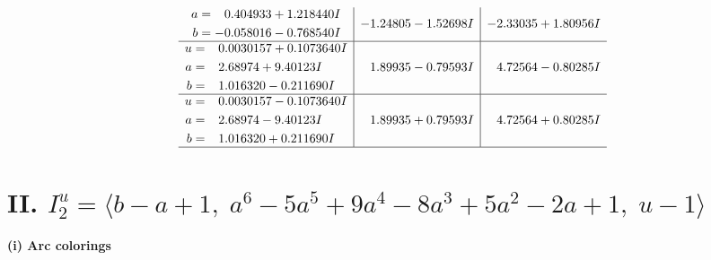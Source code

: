 \documentclass[1p]{elsarticle_modified}
\theoremstyle{definition}
\begin{document}
$$\begin{array}{c|c|c}
\begin{aligned}
a &= \phantom{-}0.404933 + 1.218440 I \\
b &= -0.058016 - 0.768540 I\end{aligned}
 & -1.24805 - 1.52698 I & -2.33035 + 1.80956 I \\ \hline\begin{aligned}
u &= \phantom{-}0.0030157 + 0.1073640 I \\
a &= \phantom{-}2.68974 + 9.40123 I \\
b &= \phantom{-}1.016320 - 0.211690 I\end{aligned}
 & \phantom{-}1.89935 - 0.79593 I & \phantom{-}4.72564 - 0.80285 I \\ \hline\begin{aligned}
u &= \phantom{-}0.0030157 - 0.1073640 I \\
a &= \phantom{-}2.68974 - 9.40123 I \\
b &= \phantom{-}1.016320 + 0.211690 I\end{aligned}
 & \phantom{-}1.89935 + 0.79593 I & \phantom{-}4.72564 + 0.80285 I\\
 \hline 
 \end{array}$$\newpage\newpage\renewcommand{\arraystretch}{1}
\centering \section*{II. $I^u_{2}= \langle b- a+1,\;a^6-5 a^5+9 a^4-8 a^3+5 a^2-2 a+1,\;u-1 \rangle$}
\flushleft \textbf{(i) Arc colorings}\\
\end{document}
